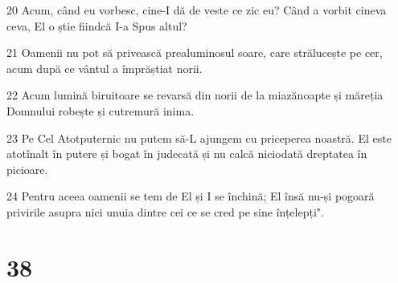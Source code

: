 \par 20 Acum, când eu vorbesc, cine-I dă de veste ce zic eu? Când a vorbit cineva ceva, El o știe fiindcă I-a Spus altul?
\par 21 Oamenii nu pot să privească prealuminosul soare, care strălucește pe cer, acum după ce vântul a împrăștiat norii.
\par 22 Acum lumină biruitoare se revarsă din norii de la miazănoapte și măreția Domnului robește și cutremură inima.
\par 23 Pe Cel Atotputernic nu putem să-L ajungem cu priceperea noastră. El este atotînalt în putere și bogat în judecată și nu calcă niciodată dreptatea în picioare.
\par 24 Pentru aceea oamenii se tem de El și I se închină; El însă nu-și pogoară privirile asupra nici unuia dintre cei ce se cred pe sine înțelepți".

\chapter{38}

